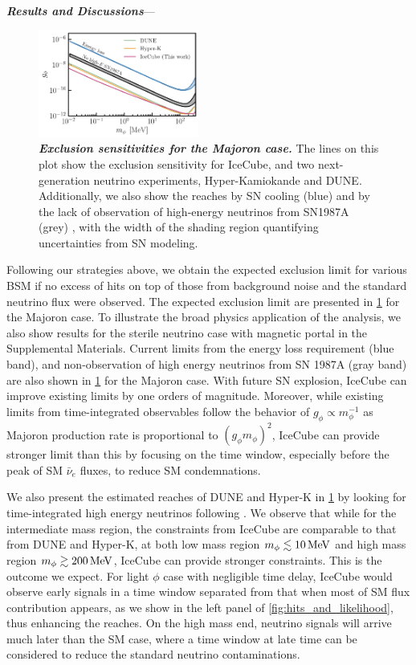 \textbf{\textit{Results and Discussions}}---
\begin{figure}[t!]
    \centering
    \includegraphics[width=0.47\textwidth]{figures/majoran_sensitivity}
    \caption{\textbf{\textit{Exclusion sensitivities for the Majoron case.}}
    The lines on this plot show the exclusion sensitivity for IceCube, and two next-generation neutrino experiments, Hyper-Kamiokande and DUNE.
    Additionally, we also show the reaches by SN cooling (blue) and by the lack of observation of high-energy neutrinos from SN1987A (grey) \cite{Fiorillo:2022cdq}, with the width of the shading region quantifying uncertainties from SN modeling.
    }
    \label{fig:sensitivity}
\end{figure} 
Following our strategies above, we obtain the expected exclusion limit for various BSM if no excess of hits on top of those from background noise and the standard neutrino flux were observed. The expected exclusion limit are presented in \cref{fig:sensitivity} for the Majoron case. To illustrate the broad physics application of the analysis, we also show results for the sterile neutrino case with magnetic portal in the Supplemental Materials. Current limits \cite{Fiorillo:2022cdq} from the energy loss requirement (blue band), and non-observation of high energy neutrinos from SN 1987A (gray band) are also shown in \cref{fig:sensitivity} for the Majoron case. 
With future SN explosion, IceCube can improve existing limits by one orders of magnitude. Moreover, while existing limits from time-integrated observables follow the behavior of $g_\phi\propto m^{-1}_\phi$ as Majoron production rate is proportional to $(g_\phi m_\phi)^2$, IceCube can provide stronger limit than this by focusing on the time window, especially before the peak of SM $\bar{\nu}_e$ fluxes, to reduce SM condemnations.

We also present the estimated reaches of DUNE and Hyper-K in \cref{fig:sensitivity} by looking for time-integrated high energy neutrinos following \cite{Fiorillo:2022cdq, Brdar:2023tmi}. We observe that while for the intermediate mass region, the constraints from IceCube are comparable to that from DUNE and Hyper-K, at both low mass region $m_\phi \lesssim \unit[10]{MeV}$ and high mass region $m_\phi \gtrsim \unit[200]{MeV}$, IceCube can provide stronger constraints. This is the outcome we expect. For light $\phi$ case with negligible time delay, IceCube would observe early signals in a time window separated from that when most of SM flux contribution appears, as we show in the left panel of \cref{fig:hits_and_likelihood}, thus enhancing the reaches. On the high mass end, neutrino signals will arrive much later than the SM case, where a time window at late time can be considered to reduce the standard neutrino contaminations. 

